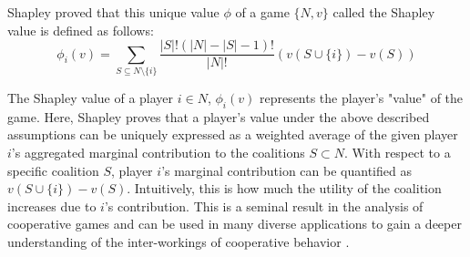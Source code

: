 Shapley proved that this unique value $\phi$ of a game $\{N,v\}$ called the Shapley value is defined as follows:
\begin{equation}
\phi_i(v) = \sum_{S \subseteq N \setminus \{i\}} \frac{|S|!(|N| - |S| - 1)!}{|N|!}(v(S \cup \{i\}) - v(S)    )
\label{shapley_value}
\end{equation}


The Shapley value of a player $i \in N$, $\phi_i(v)$ represents the player's "value" of the game.  Here, Shapley proves that a player's value under the above described assumptions can be uniquely expressed as a weighted average of the given player $i$'s aggregated marginal contribution to the coalitions $S \subset N$. With respect to a specific coalition $S$, player $i$'s marginal contribution can be quantified as $v(S \cup \{i\}) - v(S)$. Intuitively, this is how much the utility of the coalition increases due to $i$'s contribution.  This is a seminal result in the analysis of cooperative games and can be used in many diverse applications to gain a deeper understanding of the inter-workings of cooperative behavior \citep{shapleyValue}.